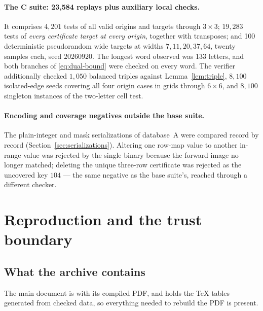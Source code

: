 \documentclass[11pt,letterpaper]{article}
\numberwithin{equation}{section}
\theoremstyle{definition}
\theoremstyle{remark}
\newcommand{\code}[1]{\texttt{\detokenize{#1}}}
\newcommand{\dbA}{\textsf{A}}
\newcommand{\dbC}{\textsf{C}}
\begin{document}
\paragraph{The \dbC{} suite: 23,584 replays plus auxiliary local checks.}
It comprises $4{,}201$ tests of all valid origins and targets through
$3\times3$; $19{,}283$ tests of \emph{every certificate target at every
origin}, together with transposes; and 100 deterministic pseudorandom wide
targets at widths $7,11,20,37,64$, twenty samples each, seed $20260920$. The
longest word observed was 133 letters, and both branches of
\eqref{eq:dual-bound} were checked on every word. The verifier additionally
checked $1{,}050$ balanced triples against Lemma~\ref{lem:triple}, $8{,}100$
isolated-edge seeds covering all four origin cases in grids through
$6\times6$, and $8{,}100$ singleton instances of the two-letter cell test.

\paragraph{Encoding and coverage negatives outside the base suite.}
The plain-integer and mask serializations of database~\dbA{} were compared
record by record (Section~\ref{sec:serializations}). Altering one row-map
value to another in-range value was rejected by the single binary because the
forward image no longer matched; deleting the unique three-row certificate
was rejected as the uncovered key $104$ --- the same negative as the base
suite's, reached through a different checker.

\section{Reproduction and the trust boundary}
\label{sec:reproduction}

\subsection{What the archive contains}
The main document is \code{shuffle_six_state.tex} with its compiled PDF, and
\code{tables} holds the TeX tables generated from checked data, so everything
needed to rebuild the PDF is present.
\end{document}
